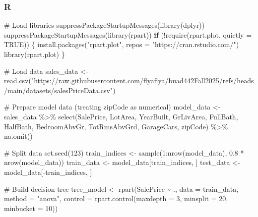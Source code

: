 \documentclass[
  letterpaper,
  DIV=11,
  numbers=noendperiod]{scrartcl}
\newenvironment{Shaded}{\begin{snugshade}}{\end{snugshade}}
\newcommand{\AttributeTok}[1]{\textcolor[rgb]{0.40,0.45,0.13}{#1}}
\newcommand{\CommentTok}[1]{\textcolor[rgb]{0.37,0.37,0.37}{#1}}
\newcommand{\ConstantTok}[1]{\textcolor[rgb]{0.56,0.35,0.01}{#1}}
\newcommand{\ControlFlowTok}[1]{\textcolor[rgb]{0.00,0.23,0.31}{\textbf{#1}}}
\newcommand{\DecValTok}[1]{\textcolor[rgb]{0.68,0.00,0.00}{#1}}
\newcommand{\FloatTok}[1]{\textcolor[rgb]{0.68,0.00,0.00}{#1}}
\newcommand{\FunctionTok}[1]{\textcolor[rgb]{0.28,0.35,0.67}{#1}}
\newcommand{\NormalTok}[1]{\textcolor[rgb]{0.00,0.23,0.31}{#1}}
\newcommand{\OtherTok}[1]{\textcolor[rgb]{0.00,0.23,0.31}{#1}}
\newcommand{\SpecialCharTok}[1]{\textcolor[rgb]{0.37,0.37,0.37}{#1}}
\newcommand{\StringTok}[1]{\textcolor[rgb]{0.13,0.47,0.30}{#1}}
\begin{document}
\subsubsection{R}

\begin{Shaded}
\begin{Highlighting}[]
\CommentTok{\# Load libraries}
\FunctionTok{suppressPackageStartupMessages}\NormalTok{(}\FunctionTok{library}\NormalTok{(dplyr))}
\FunctionTok{suppressPackageStartupMessages}\NormalTok{(}\FunctionTok{library}\NormalTok{(rpart))}
\ControlFlowTok{if}\NormalTok{ (}\SpecialCharTok{!}\FunctionTok{require}\NormalTok{(rpart.plot, }\AttributeTok{quietly =} \ConstantTok{TRUE}\NormalTok{)) \{}
  \FunctionTok{install.packages}\NormalTok{(}\StringTok{"rpart.plot"}\NormalTok{, }\AttributeTok{repos =} \StringTok{"https://cran.rstudio.com/"}\NormalTok{)}
  \FunctionTok{library}\NormalTok{(rpart.plot)}
\NormalTok{\}}

\CommentTok{\# Load data}
\NormalTok{sales\_data }\OtherTok{\textless{}{-}} \FunctionTok{read.csv}\NormalTok{(}\StringTok{"https://raw.githubusercontent.com/flyaflya/buad442Fall2025/refs/heads/main/datasets/salesPriceData.csv"}\NormalTok{)}

\CommentTok{\# Prepare model data (treating zipCode as numerical)}
\NormalTok{model\_data }\OtherTok{\textless{}{-}}\NormalTok{ sales\_data }\SpecialCharTok{\%\textgreater{}\%}
  \FunctionTok{select}\NormalTok{(SalePrice, LotArea, YearBuilt, GrLivArea, FullBath, HalfBath, }
\NormalTok{         BedroomAbvGr, TotRmsAbvGrd, GarageCars, zipCode) }\SpecialCharTok{\%\textgreater{}\%}
  \FunctionTok{na.omit}\NormalTok{()}

\CommentTok{\# Split data}
\FunctionTok{set.seed}\NormalTok{(}\DecValTok{123}\NormalTok{)}
\NormalTok{train\_indices }\OtherTok{\textless{}{-}} \FunctionTok{sample}\NormalTok{(}\DecValTok{1}\SpecialCharTok{:}\FunctionTok{nrow}\NormalTok{(model\_data), }\FloatTok{0.8} \SpecialCharTok{*} \FunctionTok{nrow}\NormalTok{(model\_data))}
\NormalTok{train\_data }\OtherTok{\textless{}{-}}\NormalTok{ model\_data[train\_indices, ]}
\NormalTok{test\_data }\OtherTok{\textless{}{-}}\NormalTok{ model\_data[}\SpecialCharTok{{-}}\NormalTok{train\_indices, ]}

\CommentTok{\# Build decision tree}
\NormalTok{tree\_model }\OtherTok{\textless{}{-}} \FunctionTok{rpart}\NormalTok{(SalePrice }\SpecialCharTok{\textasciitilde{}}\NormalTok{ ., }
                    \AttributeTok{data =}\NormalTok{ train\_data,}
                    \AttributeTok{method =} \StringTok{"anova"}\NormalTok{,}
                    \AttributeTok{control =} \FunctionTok{rpart.control}\NormalTok{(}\AttributeTok{maxdepth =} \DecValTok{3}\NormalTok{, }
                                          \AttributeTok{minsplit =} \DecValTok{20}\NormalTok{, }
                                          \AttributeTok{minbucket =} \DecValTok{10}\NormalTok{))}


\end{Highlighting}
\end{Shaded}
\end{document}

